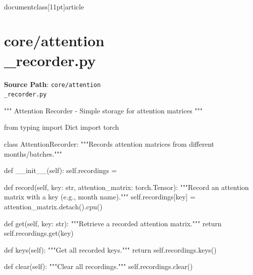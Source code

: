 \\documentclass[11pt]{article}
\begin{document}
\section*{core/attention\\_recorder.py}
\textbf{Source Path}: \texttt{core/attention\\_recorder.py}\par
\bigskip
\begin{CodeBlock}
"""
Attention Recorder - Simple storage for attention matrices
"""

from typing import Dict
import torch


class AttentionRecorder:
    """Records attention matrices from different months/batches."""
    
    def __init__(self):
        self.recordings = {}
    
    def record(self, key: str, attention_matrix: torch.Tensor):
        """Record an attention matrix with a key (e.g., month name)."""
        self.recordings[key] = attention_matrix.detach().cpu()
    
    def get(self, key: str):
        """Retrieve a recorded attention matrix."""
        return self.recordings.get(key)
    
    def keys(self):
        """Get all recorded keys."""
        return self.recordings.keys()
    
    def clear(self):
        """Clear all recordings."""
        self.recordings.clear()

\end{CodeBlock}
\end{document}

